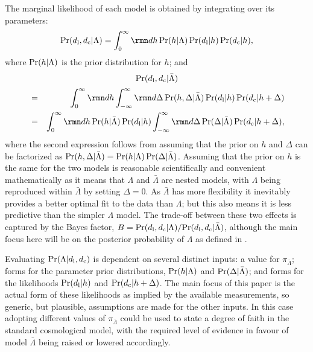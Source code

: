 \documentclass[a4paper,fleqn,usenatbib]{mnras}
\newcommand{\pdiff}{\pi_{\bar{\Lambda}}}
\newcommand{\bayesfactor}{B}
\newcommand{\msame}{\Lambda}
\newcommand{\mdiff}{\bar{\Lambda}}
\newcommand{\datl}{d_{\rm l}}
\newcommand{\datc}{d_{\rm c}}
\begin{document}
{The marginal likelihood of each model 
is obtained by integrating over its parameters:
\begin{equation}
\label{equation:evsame}
\prob(\datl, \datc | \msame)
  = \int_0^\infty \diff h
   \, \prob(h | \msame) \, \prob(\datl | h) \, \prob(\datc | h),
\end{equation}
where $\prob(h | \msame)$ is the prior distribution for $h$;
and 
\[
\prob(\datl, \datc | \mdiff)
\]
\vspace*{-4mm}
\begin{eqnarray}
\label{equation:evdiff}
  & = & 
  \int_0^\infty \diff h \int_{-\infty}^\infty \diff \Delta \,
    \prob(h, \Delta | \mdiff) \, \prob(\datl | h)
    \, \prob(\datc | h + \Delta)
  \\
  & = & 
  \int_0^\infty \diff h \,
    \prob(h | \mdiff) \, \prob(\datl | h) 
    \int_{-\infty}^\infty \diff \Delta \,
    \prob(\Delta | \mdiff) \, \prob(\datc | h + \Delta),
  \nonumber
\end{eqnarray}
where the second expression follows from assuming that the 
prior on $h$ and $\Delta$ can be factorized as
$\prob(h , \Delta | \mdiff) = \prob(h | \msame) \, \prob(\Delta | \mdiff)$.
Assuming that the prior on $h$ is the same for the two models 
is reasonable scientifically and convenient mathematically as 
it means that $\msame$ and $\mdiff$ are nested models, with 
$\msame$ being reproduced within $\mdiff$ by setting $\Delta = 0$.
As $\mdiff$ has more flexibility 
it inevitably provides a better optimal fit to the 
data than $\msame$; but 
this also means it is less predictive than 
the simpler $\msame$ model.
The trade-off between these two effects is captured by 
the Bayes factor, 
$\bayesfactor = \prob(\datl, \datc | \msame) / \prob(\datl, \datc | \mdiff)$,
although the main focus here will be on the posterior probability
of $\msame$ as defined in .

Evaluating $\prob(\msame | \datl , \datc)$ 
is dependent on several distinct inputs:
a value for $\pdiff$;
forms for the parameter prior distributions,
$\prob(h | \msame)$ and
$\prob(\Delta | \mdiff)$;
and forms for the likelihoods 
$\prob(\datl | h)$ and $\prob(\datc | h + \Delta)$.
The main focus of this paper is the actual form of these 
likelihoods as implied by the available measurements,
so generic, but plausible, assumptions are made for the 
other inputs.
In this case adopting different values of $\pdiff$ could 
be used to state a degree of faith in the standard cosmological 
model, with the required 
level of evidence in favour of model $\mdiff$ being 
raised or lowered accordingly.

}
\end{document}
